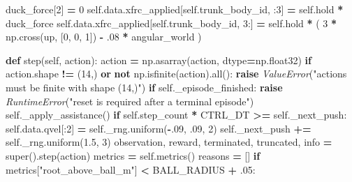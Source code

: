 \documentclass[
  american,
  11pt,
  letterpaper,
]{article}
\newenvironment{Shaded}{\begin{snugshade}}{\end{snugshade}}
\newcommand{\BuiltInTok}[1]{#1}
\newcommand{\ControlFlowTok}[1]{\textcolor[rgb]{0.13,0.29,0.53}{\textbf{#1}}}
\newcommand{\DecValTok}[1]{\textcolor[rgb]{0.00,0.00,0.81}{#1}}
\newcommand{\FloatTok}[1]{\textcolor[rgb]{0.00,0.00,0.81}{#1}}
\newcommand{\KeywordTok}[1]{\textcolor[rgb]{0.13,0.29,0.53}{\textbf{#1}}}
\newcommand{\NormalTok}[1]{#1}
\newcommand{\OperatorTok}[1]{\textcolor[rgb]{0.81,0.36,0.00}{\textbf{#1}}}
\newcommand{\PreprocessorTok}[1]{\textcolor[rgb]{0.56,0.35,0.01}{\textit{#1}}}
\newcommand{\StringTok}[1]{\textcolor[rgb]{0.31,0.60,0.02}{#1}}
\newcommand{\VariableTok}[1]{\textcolor[rgb]{0.00,0.00,0.00}{#1}}
\renewenvironment{Shaded}{\par\smallskip}{\par\smallskip}
\begin{document}
\begin{Shaded}
\begin{Highlighting}[]
\NormalTok{        duck\_force[}\DecValTok{2}\NormalTok{] }\OperatorTok{=} \DecValTok{0}
        \VariableTok{self}\NormalTok{.data.xfrc\_applied[}\VariableTok{self}\NormalTok{.trunk\_body\_id, :}\DecValTok{3}\NormalTok{] }\OperatorTok{=} \VariableTok{self}\NormalTok{.hold }\OperatorTok{*}\NormalTok{ duck\_force}
        \VariableTok{self}\NormalTok{.data.xfrc\_applied[}\VariableTok{self}\NormalTok{.trunk\_body\_id, }\DecValTok{3}\NormalTok{:] }\OperatorTok{=} \VariableTok{self}\NormalTok{.hold }\OperatorTok{*}\NormalTok{ (}
            \DecValTok{3} \OperatorTok{*}\NormalTok{ np.cross(up, [}\DecValTok{0}\NormalTok{, }\DecValTok{0}\NormalTok{, }\DecValTok{1}\NormalTok{]) }\OperatorTok{{-}} \FloatTok{.08} \OperatorTok{*}\NormalTok{ angular\_world}
\NormalTok{        )}

    \KeywordTok{def}\NormalTok{ step(}\VariableTok{self}\NormalTok{, action):}
\NormalTok{        action }\OperatorTok{=}\NormalTok{ np.asarray(action, dtype}\OperatorTok{=}\NormalTok{np.float32)}
        \ControlFlowTok{if}\NormalTok{ action.shape }\OperatorTok{!=}\NormalTok{ (}\DecValTok{14}\NormalTok{,) }\KeywordTok{or} \KeywordTok{not}\NormalTok{ np.isfinite(action).}\BuiltInTok{all}\NormalTok{():}
            \ControlFlowTok{raise} \PreprocessorTok{ValueError}\NormalTok{(}\StringTok{"actions must be finite with shape (14,)"}\NormalTok{)}
        \ControlFlowTok{if} \VariableTok{self}\NormalTok{.\_episode\_finished:}
            \ControlFlowTok{raise} \PreprocessorTok{RuntimeError}\NormalTok{(}\StringTok{"reset is required after a terminal episode"}\NormalTok{)}
        \VariableTok{self}\NormalTok{.\_apply\_assistance()}
        \ControlFlowTok{if} \VariableTok{self}\NormalTok{.step\_count }\OperatorTok{*}\NormalTok{ CTRL\_DT }\OperatorTok{\textgreater{}=} \VariableTok{self}\NormalTok{.\_next\_push:}
            \VariableTok{self}\NormalTok{.data.qvel[:}\DecValTok{2}\NormalTok{] }\OperatorTok{=} \VariableTok{self}\NormalTok{.\_rng.uniform(}\OperatorTok{{-}}\FloatTok{.09}\NormalTok{, }\FloatTok{.09}\NormalTok{, }\DecValTok{2}\NormalTok{)}
            \VariableTok{self}\NormalTok{.\_next\_push }\OperatorTok{+=} \VariableTok{self}\NormalTok{.\_rng.uniform(}\FloatTok{1.5}\NormalTok{, }\DecValTok{3}\NormalTok{)}
\NormalTok{        observation, reward, terminated, truncated, info }\OperatorTok{=} \BuiltInTok{super}\NormalTok{().step(action)}
\NormalTok{        metrics }\OperatorTok{=} \VariableTok{self}\NormalTok{.metrics()}
\NormalTok{        reasons }\OperatorTok{=}\NormalTok{ []}
        \ControlFlowTok{if}\NormalTok{ metrics[}\StringTok{"root\_above\_ball\_m"}\NormalTok{] }\OperatorTok{\textless{}}\NormalTok{ BALL\_RADIUS }\OperatorTok{+} \FloatTok{.05}\NormalTok{:}

\end{Highlighting}
\end{Shaded}
\end{document}
